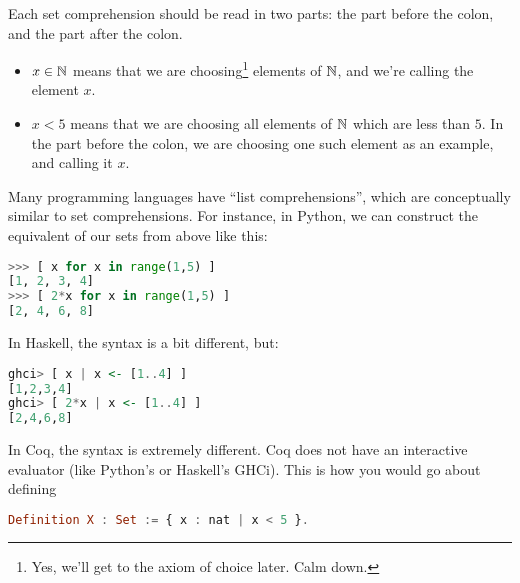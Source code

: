 Each set comprehension should be read in two parts: the part before
the colon, and the part after the colon.

\begin{itemize}
\item $x \in \mathbb{N}$ means that we are choosing\footnote{Yes, we'll get to
    the axiom of choice later. Calm down.} elements of $\mathbb{N}$, and we're
  calling the element $x$.
\item $x < 5$ means that we are choosing all elements of $\mathbb{N}$ which
  are less than $5$. In the part before the colon, we are choosing one
  such element as an example, and calling it $x$.
\end{itemize}

Many programming languages have ``list comprehensions'', which are
conceptually similar to set comprehensions. For instance, in Python,
we can construct the equivalent of our sets from above like this:

\begin{lstlisting}[language=Python]
>>> [ x for x in range(1,5) ]
[1, 2, 3, 4]
>>> [ 2*x for x in range(1,5) ]
[2, 4, 6, 8]
\end{lstlisting}

In Haskell, the syntax is a bit different, but:

\begin{lstlisting}[language=Haskell]
ghci> [ x | x <- [1..4] ]
[1,2,3,4]
ghci> [ 2*x | x <- [1..4] ]
[2,4,6,8]
\end{lstlisting}

In Coq, the syntax is extremely different. Coq does not have an
interactive evaluator (like Python's  or Haskell's
GHCi). This is how you would go about defining

\begin{lstlisting}[language=Haskell]
Definition X : Set := { x : nat | x < 5 }.
\end{lstlisting}
